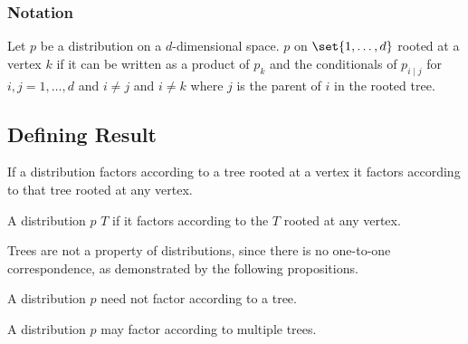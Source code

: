 \subsubsection{Notation}


Let $p$ be a distribution on
a $d$-dimensional space.
$p$
on $\set{1, \dots, d}$ rooted
at a vertex $k$ if it can be
written as a product of $p_k$
and the conditionals of $p_{i \mid j}$
for $i,j = 1, \dots, d$ and $i \neq j$
and $i \neq k$ where $j$ is the parent
of $i$ in the rooted tree.

\subsection{Defining Result}
\begin{prop}
If a distribution factors according
to a tree rooted at a vertex it
factors according to that tree rooted
at any vertex.
\end{prop}


A distribution $p$
 $T$
if it factors according to the
$T$ rooted at any vertex.


Trees are not a property of distributions,
since there is no one-to-one correspondence,
as demonstrated by the following propositions.


A distribution $p$ need not factor according to a tree.

A distribution
$p$ may factor according to multiple trees.
\strats
